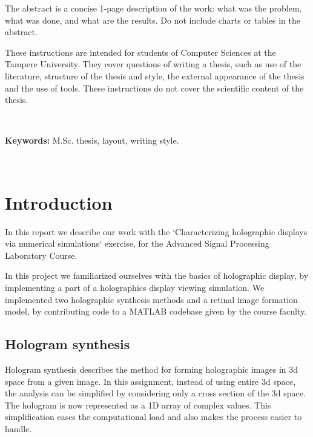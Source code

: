 \documentclass[12pt,a4paper,english
]{tunithesis}
\begin{document}
\vspace{0.5cm}


\noindent The abstract is a concise 1-page description of the work: what was the
problem, what was done, and what are the results. Do not include
charts or tables in the abstract.

These instructions are intended for students of Computer Sciences at the Tampere University. They cover questions of writing a thesis, such as use of the literature, structure of the thesis and style, the external appearance of the thesis and the use of tools.  These instructions do not cover the scientific content of the thesis.

~

\noindent\textbf{Keywords:} M.Sc. thesis, layout, writing style.

~




\setcounter{tocdepth}{3}              %
\tableofcontents                      %


\if@twoside
\cleardoublepage
\fi


\renewcommand{\chaptername}{} %


\chapter{Introduction}
\label{ch:intro}
\setcounter{page}{1} 
In this report we describe our work with the `Characterizing holographic displays via
numerical simulations` exercise, for the Advanced Signal Processing Laboratory Course.

In this project we familiarized ourselves with the basics of holographic display, by implementing a part of a holographics display viewing simulation. We implemented two holographic synthesis methods and a retinal image formation model, by contributing code to a MATLAB codebase given by the course faculty.

\section{Hologram synthesis}
Hologram synthesis describes the method for forming holographic images in 3d space from a given image. In this assignment, instead of using entire 3d space, the analysis can be simplified by considering only a cross section of the 3d space. The hologram is now represented as a 1D array of complex values. This simplification eases the computational load and also makes the process easier to handle.
\end{document}
